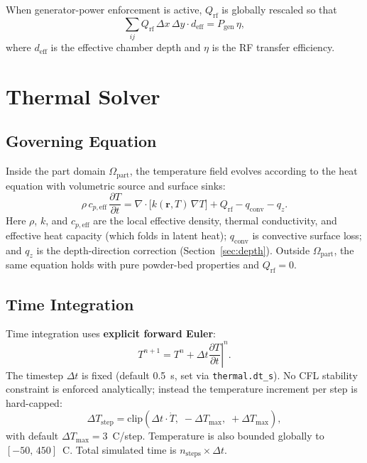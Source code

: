 \documentclass[11pt, letterpaper]{article}
\newcommand{\Qrf}{Q_{\mathrm{rf}}}
\newcommand{\cpeff}{c_{p,\mathrm{eff}}}
\newcommand{\partmask}{\Omega_{\mathrm{part}}}
\begin{document}
When generator-power enforcement is active, $\Qrf$ is globally rescaled so that
%
\begin{equation}
  \sum_{ij}\Qrf\,\Delta x\,\Delta y\cdot d_{\mathrm{eff}} = P_{\mathrm{gen}}\,\eta,
\end{equation}
%
where $d_{\mathrm{eff}}$ is the effective chamber depth and $\eta$ is the RF
transfer efficiency.

\section{Thermal Solver}
\label{sec:thermal}

\subsection{Governing Equation}

Inside the part domain $\partmask$, the temperature field evolves according to
the heat equation with volumetric source and surface sinks:
%
\begin{equation}
  \label{eq:heat}
  \rho\,\cpeff\,\frac{\partial T}{\partial t}
  = \nabla\cdot\bigl[k(\bm{r},T)\,\nabla T\bigr]
    + \Qrf
    - q_{\mathrm{conv}}
    - q_z.
\end{equation}
%
Here $\rho$, $k$, and $\cpeff$ are the local effective density, thermal
conductivity, and effective heat capacity (which folds in latent heat);
$q_{\mathrm{conv}}$ is convective surface loss; and $q_z$ is the
depth-direction correction (Section~\ref{sec:depth}).
Outside $\partmask$, the same equation holds with pure powder-bed properties
and $\Qrf=0$.

\subsection{Time Integration}

Time integration uses \textbf{explicit forward Euler}:
%
\begin{equation}
  T^{n+1} = T^n + \Delta t\left.\frac{\partial T}{\partial t}\right|^n.
\end{equation}
%
The timestep $\Delta t$ is fixed (default 0.5~s, set via \texttt{thermal.dt\_s}).
No CFL stability constraint is enforced analytically; instead the temperature
increment per step is hard-capped:
%
\begin{equation}
  \Delta T_{\mathrm{step}} = \mathrm{clip}\!\left(\Delta t\cdot\dot{T},\;
    -\Delta T_{\max},\;+\Delta T_{\max}\right),
\end{equation}
%
with default $\Delta T_{\max}=3$~\textdegree C/step.
Temperature is also bounded globally to $[-50,\,450]$~\textdegree C.
Total simulated time is $n_{\mathrm{steps}}\times\Delta t$.
\end{document}
